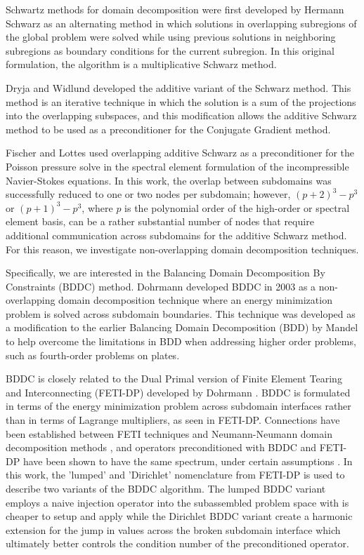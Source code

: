 Schwartz methods for domain decomposition were first developed by Hermann Schwarz \cite{schwarz1972gesammelte} as an alternating method in which solutions in overlapping subregions of the global problem were solved while using previous solutions in neighboring subregions as boundary conditions for the current subregion.
In this original formulation, the algorithm is a multiplicative Schwarz method.

Dryja and Widlund \cite{widlund1987additive,dryja1989additive} developed the additive variant of the Schwarz method.
This method is an iterative technique in which the solution is a sum of the projections into the overlapping subspaces, and this modification allows the additive Schwarz method to be used as a preconditioner for the Conjugate Gradient method.

Fischer and Lottes \cite{fischer1997overlapping,fischer2005hybrid} used overlapping additive Schwarz as a preconditioner for the Poisson pressure solve in the spectral element formulation of the incompressible Navier-Stokes equations.
In this work, the overlap between subdomains was successfully reduced to one or two nodes per subdomain; however, $\left( p + 2 \right)^3 - p^3$ or $\left( p + 1 \right)^3 - p^3$, where $p$ is the polynomial order of the high-order or spectral element basis, can be a rather substantial number of nodes that require additional communication across subdomains for the additive Schwarz method.
For this reason, we investigate non-overlapping domain decomposition techniques.

Specifically, we are interested in the Balancing Domain Decomposition By Constraints (BDDC) method.
Dohrmann \cite{dohrmann2003preconditioner} developed BDDC in 2003 as a non-overlapping domain decomposition technique where an energy minimization problem is solved across subdomain boundaries.
This technique was developed as a modification to the earlier Balancing Domain Decomposition (BDD) by Mandel \cite{mandel1993balancing} to help overcome the limitations in BDD when addressing higher order problems, such as fourth-order problems on plates.

BDDC is closely related to the Dual Primal version of Finite Element Tearing and Interconnecting (FETI-DP) developed by Dohrmann \cite{farhat1991method}.
BDDC is formulated in terms of the energy minimization problem across subdomain interfaces rather than in terms of Lagrange multipliers, as seen in FETI-DP.
Connections have been established between FETI techniques and Neumann-Neumann domain decomposition methods \cite{klawonn2001feti}, and operators preconditioned with BDDC and FETI-DP have been shown to have the same spectrum, under certain assumptions \cite{mandel2007bddc}.
In this work, the 'lumped' and 'Dirichlet' nomenclature from FETI-DP is used to describe two variants of the BDDC algorithm.
The lumped BDDC variant employs a naive injection operator into the subassembled problem space with is cheaper to setup and apply while the Dirichlet BDDC variant create a harmonic extension for the jump in values across the broken subdomain interface which ultimately better controls the condition number of the preconditioned operator.

